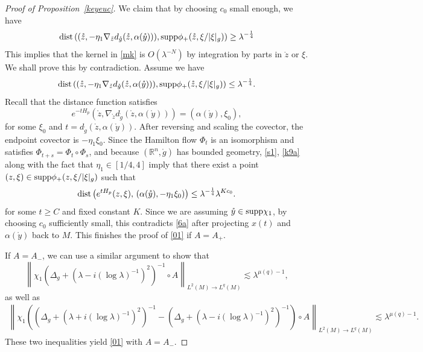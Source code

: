 \documentclass[11pt]{amsart}
\newcommand{\la}{\lambda}
\begin{document}
\begin{proof}[Proof of Proposition~\ref{keyeuc}]
 We claim that by choosing $c_0$ small enough, we have   $$\textnormal{dist}\left((\mathring z, -\eta_1\nabla_{\mathring z}d_{\mathring g}(\mathring z,\alpha(\mathring y))), \textnormal{supp} \phi_+(\mathring z,\xi/|\xi|_g)\right)\ge \la^{-\frac14}$$ This implies that the kernel in \eqref{mk} is $O(\la^{-N})$ by integration by parts in $\mathring z$ or $\xi$. We shall prove this by contradiction. Assume we have 
 \begin{equation}\label{s1}
     \textnormal{dist}\left((\mathring z,-\eta_1\nabla_{\mathring z}d_{\mathring g}(\mathring z,
 \alpha(\mathring y))), \textnormal{supp} \phi_+(\mathring z,\xi/|\xi|_g)\right)\le \la^{-\frac14}. \end{equation}
 Recall that the distance function satisfies 
 \begin{equation}\label{k9a}
 e^{-tH_p}(\mathring z,\nabla_{\mathring z}d_{\mathring g}(\mathring z,
 \alpha(\mathring y)))=(\alpha(\mathring y),\xi_0),
 \end{equation}
 for some $\xi_0$ and $t=d_{\mathring g}(\mathring z,\alpha(\mathring y))$. After reversing and scaling the covector, the endpoint covector is $-\eta_1\xi_0$. Since the Hamilton flow $\Phi_{t}$ is an isomorphism and satisfies $\Phi_{t+s}=\Phi_{t}\circ \Phi_{s}$, and because  $(\mathbb{R}^n,\mathring g)$ has bounded geometry,  \eqref{s1}, \eqref{k9a} along with the fact that $\eta_1\in [1/4,4]$ imply that there  exist a point $(z,\xi)\in \textnormal{supp} \phi_+(z,\xi/|\xi|_g)$ such that  \begin{equation}\label{s2}     \textnormal{dist}\left(e^{tH_p}(z,\xi),\, (\alpha(\mathring y),-\eta_1\xi_0)\right)\le \la^{-\frac14}\la^{Kc_0}. \end{equation}for some $t\ge C$ and fixed constant $K$. Since we are assuming $\mathring y\in \textnormal{supp} \chi_1$, by choosing $c_0$ sufficiently small, this contradicts \eqref{6a} after projecting $x(t)$ and $\alpha(\mathring y)$ back to $M$.
This finishes the proof of \eqref{01} if $A=A_+$. 

If  $A=A_-$, we can use a similar argument to show that 
\begin{equation}\label{01a}
    \left\|\chi_1\left(\Delta_g+(\la-i(\log\la)^{-1})^2\right)^{-1}\circ A\right\|_{L^2(M)\to L^q(M)}\lesssim \la^{\mu(q)-1},
\end{equation}
as well as 
\begin{align}\label{b-}
\left\|\chi_1\left(\left(\Delta_g+(\la+i(\log\la)^{-1})^2\right)^{-1}-\left(\Delta_g+(\la-i(\log\la)^{-1})^2\right)^{-1}\right)\circ A\right\|_{L^2(M)\to L^q(M)}
\lesssim \la^{\mu(q)-1}.
\end{align}
These two inequalities yield \eqref{01} with $A=A_-$.


\end{proof}
\end{document}
